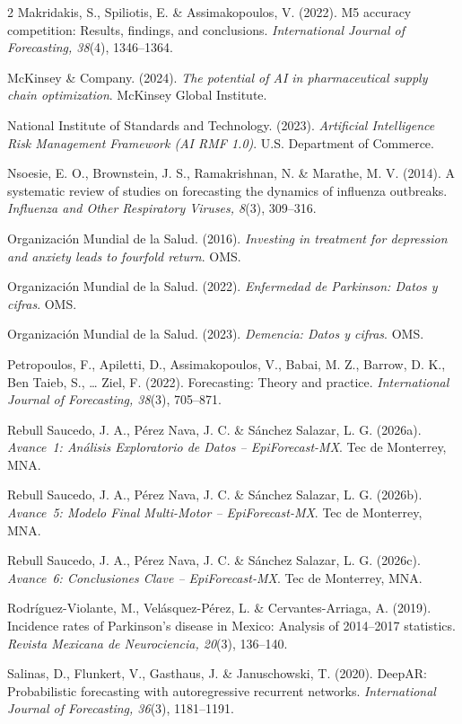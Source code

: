 \documentclass[12pt, letterpaper]{article}
\begin{document}
\begin{multicols}{2}
Makridakis, S., Spiliotis, E. \& Assimakopoulos, V. (2022). M5 accuracy competition: Results, findings, and conclusions. \textit{International Journal of Forecasting, 38}(4), 1346--1364.

McKinsey \& Company. (2024). \textit{The potential of AI in pharmaceutical supply chain optimization}. McKinsey Global Institute.

National Institute of Standards and Technology. (2023). \textit{Artificial Intelligence Risk Management Framework (AI RMF 1.0)}. U.S. Department of Commerce.

Nsoesie, E. O., Brownstein, J. S., Ramakrishnan, N. \& Marathe, M. V. (2014). A systematic review of studies on forecasting the dynamics of influenza outbreaks. \textit{Influenza and Other Respiratory Viruses, 8}(3), 309--316.

Organización Mundial de la Salud. (2016). \textit{Investing in treatment for depression and anxiety leads to fourfold return}. OMS.

Organización Mundial de la Salud. (2022). \textit{Enfermedad de Parkinson: Datos y cifras}. OMS.

Organización Mundial de la Salud. (2023). \textit{Demencia: Datos y cifras}. OMS.

Petropoulos, F., Apiletti, D., Assimakopoulos, V., Babai, M. Z., Barrow, D. K., Ben Taieb, S., \ldots{} Ziel, F. (2022). Forecasting: Theory and practice. \textit{International Journal of Forecasting, 38}(3), 705--871.

Rebull Saucedo, J. A., Pérez Nava, J. C. \& Sánchez Salazar, L. G. (2026a). \textit{Avance~1: Análisis Exploratorio de Datos -- EpiForecast-MX}. Tec de Monterrey, MNA.

Rebull Saucedo, J. A., Pérez Nava, J. C. \& Sánchez Salazar, L. G. (2026b). \textit{Avance~5: Modelo Final Multi-Motor -- EpiForecast-MX}. Tec de Monterrey, MNA.

Rebull Saucedo, J. A., Pérez Nava, J. C. \& Sánchez Salazar, L. G. (2026c). \textit{Avance~6: Conclusiones Clave -- EpiForecast-MX}. Tec de Monterrey, MNA.

Rodríguez-Violante, M., Velásquez-Pérez, L. \& Cervantes-Arriaga, A. (2019). Incidence rates of Parkinson's disease in Mexico: Analysis of 2014--2017 statistics. \textit{Revista Mexicana de Neurociencia, 20}(3), 136--140.

Salinas, D., Flunkert, V., Gasthaus, J. \& Januschowski, T. (2020). DeepAR: Probabilistic forecasting with autoregressive recurrent networks. \textit{International Journal of Forecasting, 36}(3), 1181--1191.


\end{multicols}
\end{document}
